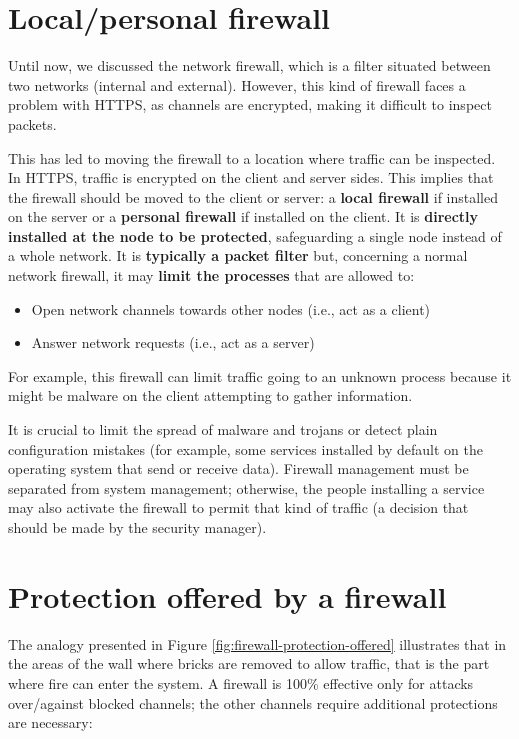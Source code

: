 \section{Local/personal firewall}

Until now, we discussed the network firewall, which is a filter situated between two networks (internal and external). However, this kind of firewall faces a problem with HTTPS, as channels are encrypted, making it difficult to inspect packets.

This has led to moving the firewall to a location where traffic can be inspected. In HTTPS, traffic is encrypted on the client and server sides. This implies that the firewall should be moved to the client or server: a \textbf{local firewall} if installed on the server or a \textbf{personal firewall} if installed on the client. It is \textbf{directly installed at the node to be protected}, safeguarding a single node instead of a whole network. It is \textbf{typically a packet filter} but, concerning a normal network firewall, it may \textbf{limit the processes} that are allowed to:
\begin{itemize}
	\item Open network channels towards other nodes (i.e., act as a client)
	\item Answer network requests (i.e., act as a server)
\end{itemize}

For example, this firewall can limit traffic going to an unknown process because it might be malware on the client attempting to gather information.

It is crucial to limit the spread of malware and trojans or detect plain configuration mistakes (for example, some services installed by default on the operating system that send or receive data). Firewall management must be separated from system management; otherwise, the people installing a service may also activate the firewall to permit that kind of traffic (a decision that should be made by the security manager).



\section{Protection offered by a firewall}

The analogy presented in Figure \ref*{fig:firewall-protection-offered} illustrates that in the areas of the wall where bricks are removed to allow traffic, that is the part where fire can enter the system. A firewall is 100\% effective only for attacks over/against
blocked channels; the other channels require additional protections are necessary:


